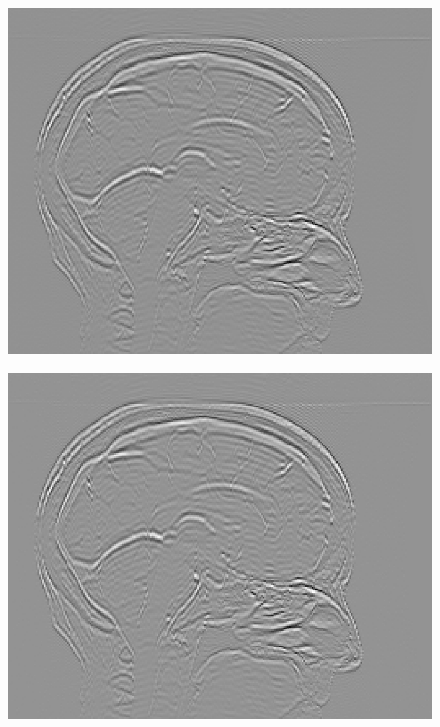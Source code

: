 \documentclass[fleqn,a4paper,oneside,openany]{book}
\begin{document}
%
\begin{figure}
\centering
   \begin{minipage}[b]{150pt}
     \centering
     \includegraphics[trim = 0 0 0 0, clip, scale=0.4]{radiomics_filtering/interpolation_image_hi_1mm_1_hi.png}
     \label{fig:radiomics_linear_1mm_high_pass}
     \hspace{100pt}
   \end{minipage}
   \begin{minipage}[b]{150pt}
     \centering
     \includegraphics[trim = 0 0 0 0, clip, scale=0.4]{radiomics_filtering/interpolation_image_hi_1mm_3_hi.png}

\end{minipage}
\end{figure}
\end{document}
